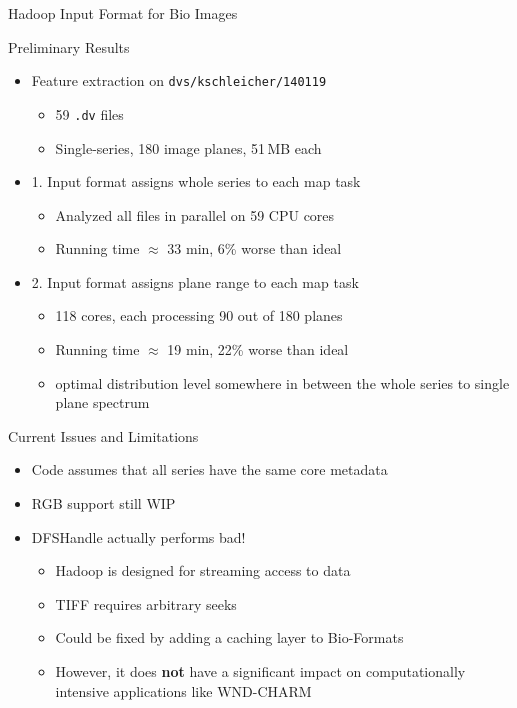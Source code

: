 \documentclass[compress]{beamer}
\begin{document}
\begin{frame}{Hadoop Input Format for Bio Images}
  \begin{center}
  \end{center}
\end{frame}

\begin{frame}{Preliminary Results}
\begin{center}
  \begin{itemize}
  \item Feature extraction on \texttt{dvs/kschleicher/140119}
    \begin{itemize}
    \item 59 \texttt{.dv} files
    \item Single-series, 180 image planes, 51\,MB each
    \end{itemize}
  \item 1. Input format assigns whole series to each map task
    \begin{itemize}
    \item Analyzed all files in parallel on 59 CPU cores
    \item Running time $\approx$ 33 min, 6\% worse than ideal
    \end{itemize}
    \item 2. Input format assigns plane range to each map task
      \begin{itemize}
      \item 118 cores, each processing 90 out of 180 planes
      \item Running time $\approx$ 19 min, 22\% worse than ideal
      \item optimal distribution level somewhere in between the whole
        series to single plane spectrum
      \end{itemize}
  \end{itemize}
\end{center}
\end{frame}

\begin{frame}{Current Issues and Limitations}
\begin{center}
  \begin{itemize}
  \item Code assumes that all series have the same core metadata
  \item RGB support still WIP
  \item DFSHandle actually performs bad!
    \begin{itemize}
    \item Hadoop is designed for streaming access to data
    \item TIFF requires arbitrary seeks
    \item Could be fixed by adding a caching layer to Bio-Formats
    \item However, it does \textbf{not} have a significant impact on
      computationally intensive applications like WND-CHARM
    \end{itemize}
  \end{itemize}
\end{center}
\end{frame}
\end{document}
